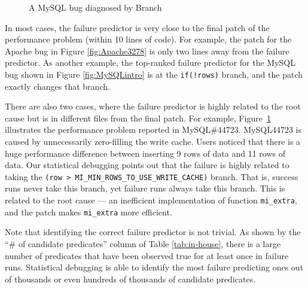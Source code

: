 \begin{figure}
\centering

\caption{A MySQL bug diagnosed by Branch}
\label{fig:MySQL44723}
\end{figure}

In most cases, the failure predictor
is very close to the final patch of the performance problem (within 10 lines
of code).
For example, the patch for the Apache bug in Figure 
\ref{fig:Apache3278} is only two lines away from the failure predictor.
As another example, 
the top-ranked failure predictor for the MySQL bug shown in 
Figure \ref{fig:MySQLintro} is at the \lstinline{if(!rows)} branch, and
the patch exactly changes that branch. 




There are also two cases, where the failure predictor is highly related to the
root cause but is in different files from the final patch.
For example, Figure~\ref{fig:MySQL44723} illustrates the performance problem
reported in MySQL\#44723.
MySQL44723 is caused by unnecessarily zero-filling the write cache. 
Users noticed that there is a huge performance difference between 
inserting 9 rows of data and 11 rows of data.
Our statistical debugging points out that the failure is highly
related to taking the
\texttt{(row > MI\_MIN\_ROWS\_TO\_USE\_WRITE\_CACHE)} branch.
That is, success runs never take this branch, yet failure runs always
take this branch.
This is related to the root cause --- an inefficient implementation
of function \texttt{mi\_extra}, and the patch makes \texttt{mi\_extra}
more efficient.

Note that identifying the correct failure predictor is not trivial.
As shown by the ``\# of candidate predicates'' column
of Table \ref{tab:in-house}, there is a large number of predicates that
have been observed true for at least once in failure runs.
Statistical debugging is able to identify the most failure predicting ones
out of thousands or even hundreds of thousands of candidate predicates.

